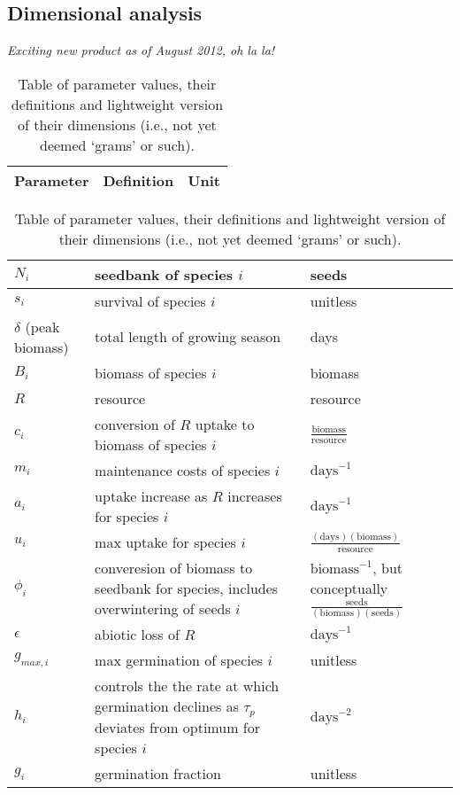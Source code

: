 \documentclass[11pt,a4paper,oneside]{article}
\begin{document}
\subsection{Dimensional analysis}
\noindent \emph{Exciting new product as of August 2012, oh la la!}
\begin{center}
\begin{table}[h!]
\caption{Table of parameter values, their definitions and lightweight version of their dimensions (i.e., not yet deemed `grams' or such).}
\begin{tabular}{ | p{3.0cm} | p{6.0cm} | p{4.0cm} |}
\hline 
Parameter & Definition & Unit \\ \hline 
\end{tabular}
\begin{tabular}{ | p{3.0cm} | p{6.0cm} | p{4.0cm} |}
\(N_{i}\) & seedbank of species \(i\) & seeds \\ \hline
\(s_{i}\) & survival of species \(i\) & unitless \\ \hline
\(\delta\) (peak biomass) & total length of growing season & days\\ \hline
\(B_{i}\) & biomass of species \(i\) & biomass \\ \hline
\(R\) & resource & resource\\ \hline
\(c_{i}\) & conversion of \(R\) uptake to biomass of species \(i\) &  \(\frac{\text{biomass}}{\text{resource}}\) \\ \hline
\(m_{i}\) & maintenance costs of species \(i\) & \(\text{days}^{-1}\) \\ \hline
\(a_{i}\) & uptake increase as \(R\) increases for species \(i\) & \(\text{days}^{-1}\) \\ \hline
\(u_{i}\) & max uptake for species \(i\) & \(\frac{(\text{days})(\text{biomass})}{\text{resource}}\) \\ \hline
\(\phi_{i}\) & converesion of biomass to seedbank for species, includes overwintering of seeds \(i\) & \(\text{biomass}^{-1}\), but conceptually \(\frac{\text{seeds}}{(\text{biomass})(\text{seeds})}\) \\ \hline
\(\epsilon\) & abiotic loss of \(R\) &  \(\text{days}^{-1}\) \\ \hline
\(g_{max,i}\) & max germination of species \(i\) & unitless \\ \hline
\(h_{i}\) &  controls the the rate at which germination declines as \(\tau_{p}\) deviates from optimum for species \(i\)  & \(\text{days}^{-2}\) \\ \hline
\(g_{i}\) & germination fraction & unitless \\ \hline

\end{tabular}
\end{table}
\end{center}
\end{document}
